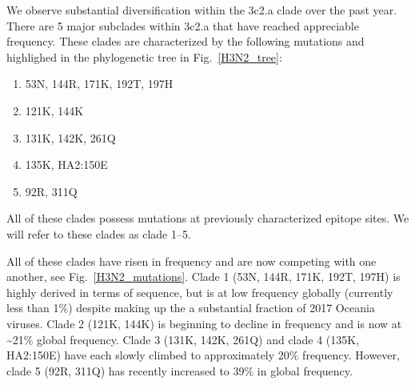 \documentclass[11pt,oneside,letterpaper]{article}
\newcommand{\FIG}[1]{Fig.~\ref{#1}}
\begin{document}
We observe substantial diversification within the 3c2.a clade over the
past year. There are 5 major subclades within 3c2.a that have reached
appreciable frequency. These clades are characterized by the following
mutations and highlighed in the phylogenetic tree in \FIG{H3N2_tree}:

\begin{enumerate}
\item
  53N, 144R, 171K, 192T, 197H
\item
  121K, 144K
\item
  131K, 142K, 261Q
\item
  135K, HA2:150E
\item
  92R, 311Q
\end{enumerate}

All of these clades possess mutations at previously characterized
epitope sites. We will refer to these clades as clade 1--5.

All of these clades have risen in frequency and are now competing with
one another, see \FIG{H3N2_mutations}. Clade 1 (53N, 144R, 171K, 192T, 197H) is highly derived in
terms of sequence, but is at low frequency globally (currently less than
1\%) despite making up the a substantial fraction of 2017 Oceania
viruses. Clade 2 (121K, 144K) is beginning to decline in frequency and
is now at \textasciitilde{}21\% global frequency. Clade 3 (131K, 142K,
261Q) and clade 4 (135K, HA2:150E) have each slowly climbed to
approximately 20\% frequency. However, clade 5 (92R, 311Q) has recently
increased to 39\% in global frequency.
\end{document}
